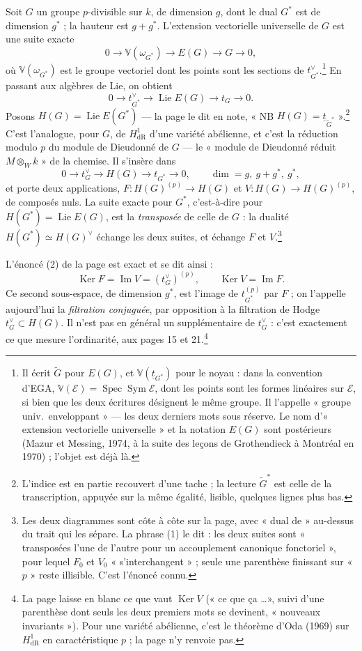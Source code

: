 \documentclass[11pt,a4paper]{article}
\begin{document}
Soit $G$ un groupe $p$-divisible sur $k$, de dimension $g$, dont le dual
$G^*$ est de dimension $g^*$ ; la hauteur est $g + g^*$. L'extension
vectorielle universelle de $G$ est une suite exacte
\[
0 \to \mathbb{V}(\omega_{G^*}) \to E(G) \to G \to 0 ,
\]
où $\mathbb{V}(\omega_{G^*})$ est le groupe vectoriel dont les points sont les
sections de $t_{G^*}^\vee$.\footnote{Il écrit $\tilde G$ pour $E(G)$, et
$\mathbb{V}(\underline{t}_{G^*})$ pour le noyau : dans la convention d'EGA,
$\mathbb{V}(\mathcal{E}) = \operatorname{Spec}\operatorname{Sym}\mathcal{E}$, dont les points sont les formes
linéaires sur $\mathcal{E}$, si bien que les deux écritures désignent le même
groupe. Il l'appelle « groupe univ.\ enveloppant » --- les deux derniers mots
sous réserve. Le nom d'« extension vectorielle universelle » et la notation $E(G)$
sont postérieurs (Mazur et Messing, 1974, à la suite des leçons de
Grothendieck à Montréal en 1970) ; l'objet est déjà là.} En passant aux
algèbres de Lie, on obtient
\[
0 \to t_{G^*}^\vee \to \operatorname{Lie} E(G) \to t_G \to 0 .
\]
Posons $H(G) = \operatorname{Lie} E(G^*)$ --- la page le dit en note, « NB
$H(G) = \underline{t}_{\tilde G^*}$ ».\footnote{L'indice est en partie
recouvert d'une tache ; la lecture $\tilde G^*$ est celle de la transcription,
appuyée sur la même égalité, lisible, quelques lignes plus bas.} C'est
l'analogue, pour $G$, de $H^1_{\mathrm{dR}}$ d'une variété abélienne, et c'est
la réduction modulo $p$ du module de Dieudonné de $G$ --- le « module de
Dieudonné réduit $M \otimes_W k$ » de la chemise. Il s'insère dans
\[
0 \to t_G^\vee \to H(G) \to t_{G^*} \to 0 ,
\qquad
\dim = g,\ g + g^*,\ g^* ,
\]
et porte deux applications, $F : H(G)^{(p)} \to H(G)$ et $V : H(G) \to
H(G)^{(p)}$, de composés nuls. La suite exacte pour $G^*$, c'est-à-dire pour
$H(G^*) = \operatorname{Lie} E(G)$, est la \emph{transposée} de celle de $G$ :
la dualité $H(G^*) \simeq H(G)^\vee$ échange les deux suites, et échange $F$
et $V$.\footnote{Les deux diagrammes sont côte à côte sur la page, avec
« dual de » au-dessus du trait qui les sépare. La phrase (1) le dit : les
deux suites sont « transposées l'une de l'autre pour un accouplement canonique
fonctoriel », pour lequel $F_0$ et $V_0$ « s'interchangent » ; seule une
parenthèse finissant sur « $p$ » reste illisible. C'est l'énoncé connu.}

L'énoncé (2) de la page est exact et se dit ainsi :
\[
\operatorname{Ker} F = \operatorname{Im} V = (t_G^\vee)^{(p)} ,
\qquad
\operatorname{Ker} V = \operatorname{Im} F .
\]
Ce second sous-espace, de dimension $g^*$, est l'image de $t_{G^*}^{(p)}$ par
$F$ ; on l'appelle aujourd'hui la \emph{filtration conjuguée}, par opposition à
la filtration de Hodge $t_G^\vee \subset H(G)$. Il n'est pas en général un
supplémentaire de $t_G^\vee$ : c'est exactement ce que mesure l'ordinarité, aux
pages 15 et 21.\footnote{La page laisse en blanc ce que vaut $\operatorname{Ker}
V$ (« ce que ça \ldots », suivi d'une parenthèse dont seuls les deux premiers
mots se devinent, « nouveaux invariants »). Pour une variété
abélienne, c'est le théorème d'Oda (1969) sur $H^1_{\mathrm{dR}}$ en
caractéristique $p$ ; la page n'y renvoie pas.}
\end{document}
